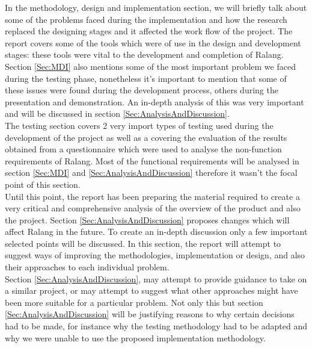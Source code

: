 \documentclass[a4paper]{article}
\begin{document}
	In the methodology, design and implementation section, we will briefly talk about some of the problems faced during the implementation and how the research replaced the designing stages and it affected the work flow of the project. The report covers some of the tools which were of use in the design and development stages: these tools were vital to the development and completion of Ralang.\\
	
	Section \ref{Sec:MDI} also mentions some of the most important problem we faced during the testing phase, nonetheless it's important to mention that some of these issues were found during the development process, others during the presentation and demonstration. An in-depth analysis of this was very important and will be discussed in section \ref{Sec:AnalysisAndDiscussion}.\\
	
	The testing section covers 2 very import types of testing used during the development of the project as well as a covering the evaluation of the results obtained from a questionnaire which were used to analyse the non-function requirements of Ralang. Most of the functional requirements will be analysed in section \ref{Sec:MDI} and \ref{Sec:AnalysisAndDiscussion} therefore it wasn't the focal point of this section.\\
	
	Until this point, the report has been preparing the material required to create a very critical and comprehensive analysis of the overview of the product and also the project. Section \ref{Sec:AnalysisAndDiscussion} proposes changes which will affect Ralang in the future. To create an in-depth discussion only a few important selected points will be discussed. In this section, the report will attempt to suggest ways of improving the methodologies, implementation or design, and also their approaches to each individual problem.\\
	
	Section \ref{Sec:AnalysisAndDiscussion}, may attempt to provide guidance to take on a similar project, or may attempt to suggest what other approaches might have been more suitable for a particular problem. Not only this but section \ref{Sec:AnalysisAndDiscussion} will be justifying reasons to why certain decisions had to be made, for instance why the testing methodology had to be adapted and why we were unable to use the proposed implementation methodology.\\
	
\end{document}
